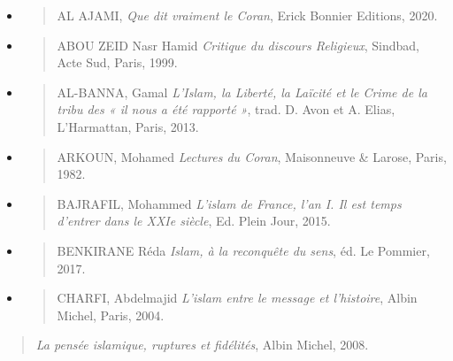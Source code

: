 \begin{itemize}
\item
  \begin{quote}
  AL AJAMI, \emph{Que dit vraiment le Coran}, Erick Bonnier Editions,
  2020.
  \end{quote}
\item
  \begin{quote}
  ABOU ZEID Nasr Hamid \emph{Critique du discours Religieux}, Sindbad,
  Acte Sud, Paris, 1999.
  \end{quote}
\item
  \begin{quote}
  AL-BANNA, Gamal \emph{L'Islam, la Liberté, la Laïcité et le Crime de
  la tribu des « il nous a été rapporté »}, trad. D. Avon et A. Elias,
  L'Harmattan, Paris, 2013.
  \end{quote}
\item
  \begin{quote}
  ARKOUN, Mohamed \emph{Lectures du Coran}, Maisonneuve \& Larose,
  Paris, 1982.
  \end{quote}
\item
  \begin{quote}
  BAJRAFIL, Mohammed \emph{L'islam de France, l'an I. Il est temps
  d'entrer dans le XXIe siècle}, Ed. Plein Jour, 2015.
  \end{quote}
\item
  \begin{quote}
  BENKIRANE Réda \emph{Islam, à la reconquête du sens}, éd. Le Pommier,
  2017.
  \end{quote}
\item
  \begin{quote}
  CHARFI, Abdelmajid \emph{L'islam entre le message et l'histoire},
  Albin Michel, Paris, 2004.
  \end{quote}
\end{itemize}

\begin{quote}
\emph{La pensée islamique, ruptures et fidélités}, Albin Michel, 2008.
\end{quote}

